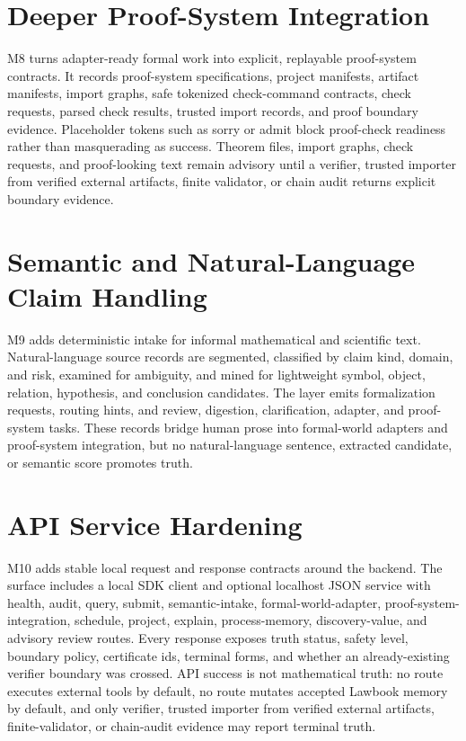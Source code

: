 \documentclass[11pt,a4paper]{article}
\begin{document}
\section{Deeper Proof-System Integration}
M8 turns adapter-ready formal work into explicit, replayable proof-system
contracts. It records proof-system specifications, project manifests, artifact
manifests, import graphs, safe tokenized check-command contracts, check
requests, parsed check results, trusted import records, and proof boundary
evidence. Placeholder tokens such as sorry or admit block proof-check readiness
rather than masquerading as success. Theorem files, import graphs, check
requests, and proof-looking text remain advisory until a verifier, trusted
importer from verified external artifacts, finite validator, or chain audit
returns explicit boundary evidence.

\section{Semantic and Natural-Language Claim Handling}
M9 adds deterministic intake for informal mathematical and scientific text.
Natural-language source records are segmented, classified by claim kind,
domain, and risk, examined for ambiguity, and mined for lightweight symbol,
object, relation, hypothesis, and conclusion candidates. The layer emits
formalization requests, routing hints, and review, digestion, clarification,
adapter, and proof-system tasks. These records bridge human prose into
formal-world adapters and proof-system integration, but no natural-language
sentence, extracted candidate, or semantic score promotes truth.

\section{API Service Hardening}
M10 adds stable local request and response contracts around the backend. The
surface includes a local SDK client and optional localhost JSON service with
health, audit, query, submit, semantic-intake, formal-world-adapter,
proof-system-integration, schedule, project, explain, process-memory,
discovery-value, and advisory review routes. Every response exposes truth
status, safety level, boundary policy, certificate ids, terminal forms, and
whether an already-existing verifier boundary was crossed. API success is not
mathematical truth: no route executes external tools by default, no route
mutates accepted Lawbook memory by default, and only verifier, trusted importer
from verified external artifacts, finite-validator, or chain-audit evidence may
report terminal truth.
\end{document}

